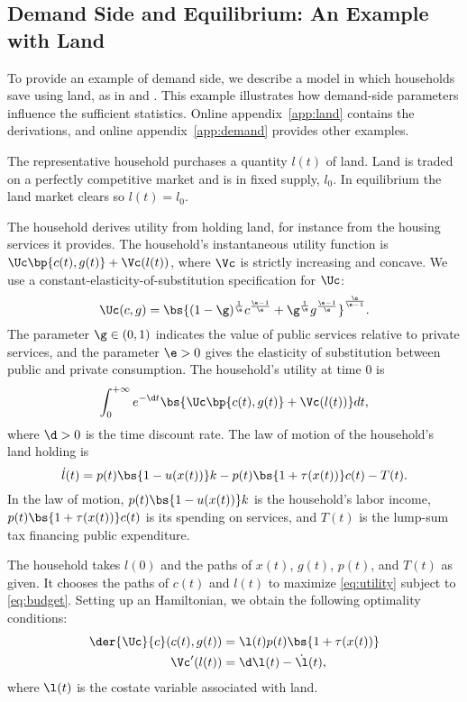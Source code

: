 \documentclass[letterpaper,12pt,leqno]{article}
\begin{document}
\begin{bibunit}
\subsection{Demand Side and Equilibrium: An Example with Land}\label{sec:land}

To provide an example of demand side, we describe a model in which households save using land, as in  and . This example illustrates how demand-side parameters influence the sufficient statistics. Online appendix~\ref{app:land} contains the derivations, and online appendix~\ref{app:demand} provides other examples. 

The representative household purchases a quantity $l(t)$ of land. Land is traded on a perfectly competitive market and is in fixed supply, $l_{0}$. In equilibrium the land market clears so $l(t)=l_{0}$.

The household derives utility from holding land, for instance from the housing services it provides. The household's instantaneous utility function is $\Uc\bp{c(t),g(t)}+\Vc(l(t))$, where $\Vc$ is strictly increasing and concave. We use a constant-elasticity-of-substitution specification for $\Uc$:
\begin{equation}
\Uc(c,g)=\bs{(1-\g)^{\frac{1}{\e}}  c^{\frac{\e-1}{\e}}+\g^{\frac{1}{\e}}  g^{\frac{\e-1}{\e}}}^{\frac{\e}{\e-1}}.
\label{eq:U}\end{equation}
The parameter $\g\in(0,1)$ indicates the value of public services relative to private services, and the parameter $\e>0$ gives the elasticity of substitution between public and private consumption. The household's utility at time $0$ is 
\begin{equation}
\int_{0}^{+\infty}e^{-\d  t}  \bs{ \Uc\bp{c(t),g(t)} + \Vc(l(t))} dt,
\label{eq:utility}\end{equation}
where $\d>0$ is the time discount rate. The law of motion of the household's land holding is
\begin{equation}
\dot{l}(t)=p(t)  \bs{1-u(x(t))}  k - p(t)  \bs{1+\tau(x(t))}  c(t) - T(t).
\label{eq:budget}\end{equation}
In the law of motion, $p(t)  \bs{1-u(x(t))}  k$ is the household's labor income, $p(t)  \bs{1+\tau(x(t))}  c(t)$ is its spending on services, and $T(t)$ is the lump-sum tax financing public expenditure.

The household takes $l(0)$ and the paths of $x(t)$, $g(t)$, $p(t)$, and $T(t)$ as given. It chooses the paths of $c(t)$ and $l(t)$ to maximize \eqref{eq:utility} subject to \eqref{eq:budget}. Setting up an Hamiltonian, we obtain the following optimality conditions:
\begin{align}
\der{\Uc}{c}(c(t),g(t)) & = \l(t)  p(t)  \bs{1+\tau(x(t))}\label{eq:foc1}\\
\Vc'(l(t)) & = \d  \l(t)-\dot{\l}(t),\label{eq:foc2}
\end{align}
where $\l(t)$ is the costate variable associated with land.


\end{bibunit}
\end{document}
